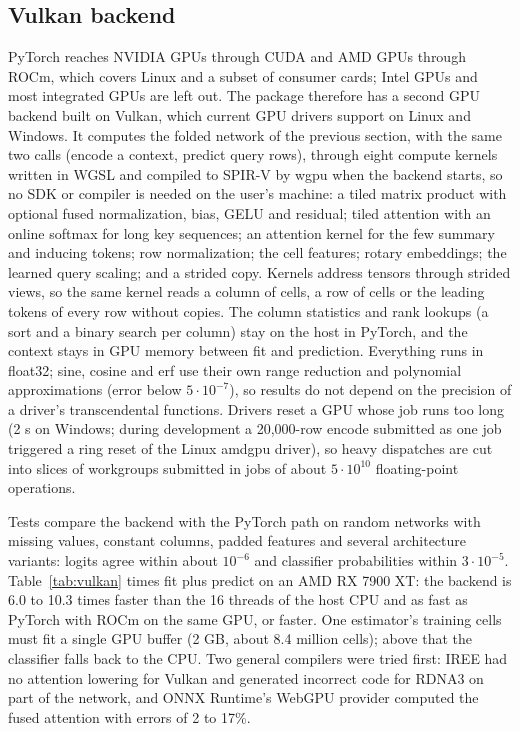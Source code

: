 \documentclass[11pt]{article}
\begin{document}
\subsection{Vulkan backend}
\label{sec:vulkan}
PyTorch reaches NVIDIA GPUs through CUDA and AMD GPUs through ROCm, which covers Linux and a subset of consumer
cards; Intel GPUs and most integrated GPUs are left out. The package therefore has a second GPU backend built on
Vulkan, which current GPU drivers support on Linux and Windows. It computes the folded network of the previous
section, with the same two calls (encode a context, predict query rows), through eight compute kernels written in
WGSL and compiled to SPIR-V by wgpu when the backend starts, so no SDK or compiler is needed on the user's machine:
a tiled matrix product with optional fused normalization, bias, GELU and residual; tiled attention with an online
softmax for long key sequences; an attention kernel for the few summary and inducing tokens; row normalization;
the cell features; rotary embeddings; the learned query scaling; and a strided copy. Kernels address tensors
through strided views, so the same kernel reads a column of cells, a row of cells or the leading tokens of every
row without copies. The column statistics and rank lookups (a sort and a binary search per column) stay on the
host in PyTorch, and the context stays in GPU memory between fit and prediction. Everything runs in float32;
sine, cosine and erf use their own range reduction and polynomial approximations (error below $5\cdot10^{-7}$),
so results do not depend on the precision of a driver's transcendental functions. Drivers reset a GPU whose job
runs too long (2 s on Windows; during development a 20,000-row encode submitted as one job triggered a ring reset
of the Linux amdgpu driver), so heavy dispatches are cut into slices of workgroups submitted in jobs of about
$5\cdot10^{10}$ floating-point operations.

Tests compare the backend with the PyTorch path on random networks with missing values, constant columns, padded
features and several architecture variants: logits agree within about $10^{-6}$ and classifier probabilities within
$3\cdot10^{-5}$. Table~\ref{tab:vulkan} times fit plus predict on an AMD RX 7900 XT: the backend is 6.0 to 10.3
times faster than the 16 threads of the host CPU and as fast as PyTorch with ROCm on the same GPU, or faster. One
estimator's training cells must fit a single GPU buffer (2 GB, about 8.4 million cells); above that the classifier
falls back to the CPU. Two general compilers were tried first: IREE had no attention lowering for Vulkan and
generated incorrect code for RDNA3 on part of the network, and ONNX Runtime's WebGPU provider computed the fused
attention with errors of 2 to 17\%.
\end{document}

